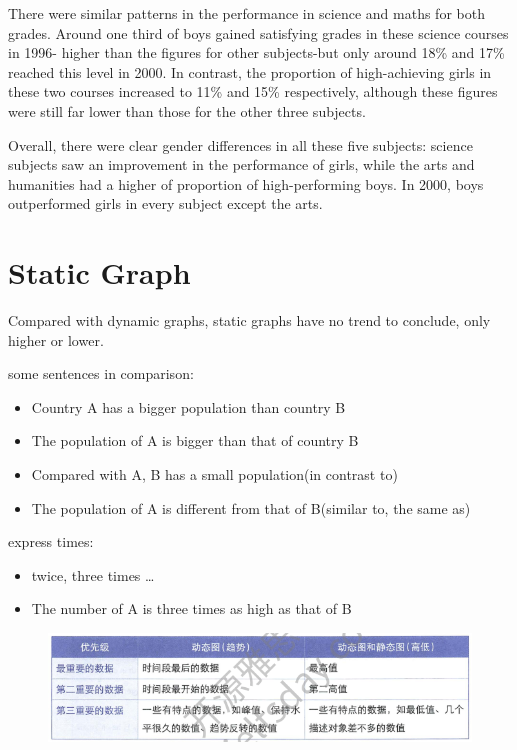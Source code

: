 \documentclass[conference]{IEEEtran}
\begin{document}
There were similar patterns in the performance in science and maths for both grades.
Around one third of boys gained satisfying grades in these science courses in 1996-
higher than the figures for other subjects-but only around 18\% and 17\% reached this level in 2000.
In contrast, the proportion of high-achieving girls in these two courses increased to 11\% and 15\% respectively,
although these figures were still far lower than those for the other three subjects.

Overall, there were clear gender differences in all these five subjects: 
science subjects saw an improvement in the performance of girls, while the arts and humanities had a higher of proportion of high-performing boys.
In 2000, boys outperformed girls in every subject except the arts.


\section{Static Graph}

Compared with dynamic graphs, static graphs have no trend to conclude, only higher or lower.

some sentences in comparison:
\begin{itemize}
    \item Country A has a bigger population than country B
    \item The population of A is bigger than that of country B
    \item Compared with A, B has a small population(in contrast to)
    \item The population of A is different from that of B(similar to, the same as)
\end{itemize}

express times:
\begin{itemize}
    \item twice, three times \dots
    \item The number of A is three times as high as that of B
\end{itemize}

\begin{figure}[htbp]
    \centerline{\includegraphics[width=1.1\columnwidth]{images/Screenshot from 2022-12-05 11-00-39.png}}
\end{figure}
\end{document}
